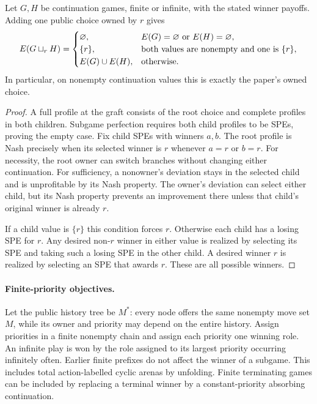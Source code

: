 \begin{proposition}\label{olv:prop:infinite-grafting}
Let $G,H$ be continuation games, finite or infinite, with the stated
winner payoffs. Adding one public choice owned by $r$ gives
\[
 E(G\mathbin{\sqcup_{r}} H)=
 \begin{cases}
  \varnothing,&E(G)=\varnothing\text{ or }E(H)=\varnothing,\\
  \{r\},&\text{both values are nonempty and one is }\{r\},\\
  E(G)\cup E(H),&\text{otherwise}.
 \end{cases}
\]
In particular, on nonempty continuation values this is exactly the
paper's owned choice.
\end{proposition}
\begin{proof}
A full profile at the graft consists of the root choice and complete
profiles in both children. Subgame perfection requires both child
profiles to be SPEs, proving the empty case. Fix child SPEs with
winners $a,b$. The root profile is Nash precisely when its selected
winner is $r$ whenever $a=r$ or $b=r$. For necessity, the root owner
can switch branches without changing either continuation. For
sufficiency, a nonowner's deviation stays in the selected child and
is unprofitable by its Nash property. The owner's deviation can
select either child, but its Nash property prevents an improvement
there unless that child's original winner is already $r$.

If a child value is $\{r\}$ this condition forces $r$. Otherwise
each child has a losing SPE for $r$. Any desired non-$r$ winner in
either value is realized by selecting its SPE and taking such a
losing SPE in the other child. A desired winner $r$ is realized by
selecting an SPE that awards $r$. These are all possible winners.
\end{proof}

\paragraph{Finite-priority objectives.}
Let the public history tree be $M^*$: every node offers the same
nonempty move set $M$, while its owner and priority may depend on the entire history.
Assign priorities in a finite nonempty chain and assign each priority
one winning role. An infinite play is won by the role assigned to its
largest priority occurring infinitely often. Earlier finite prefixes
do not affect the winner of a subgame. This includes total
action-labelled cyclic arenas by unfolding. Finite terminating games
can be included by replacing a terminal winner by a constant-priority
absorbing continuation.

